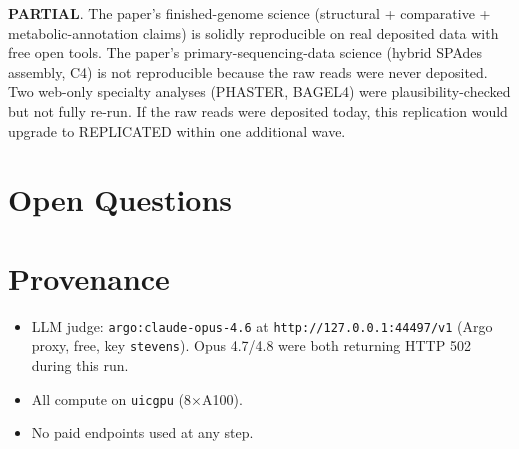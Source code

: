 \documentclass[11pt,letterpaper]{article}
\begin{document}
\textbf{PARTIAL}. The paper's finished-genome science (structural + comparative + metabolic-annotation claims) is solidly reproducible on real deposited data with free open tools. The paper's primary-sequencing-data science (hybrid SPAdes assembly, C4) is not reproducible because the raw reads were never deposited. Two web-only specialty analyses (PHASTER, BAGEL4) were plausibility-checked but not fully re-run. If the raw reads were deposited today, this replication would upgrade to REPLICATED within one additional wave.

\section{Open Questions}



\section{Provenance}

\begin{itemize}
  \item LLM judge: \texttt{argo:claude-opus-4.6} at \texttt{http://127.0.0.1:44497/v1} (Argo proxy, free, key \texttt{stevens}). Opus 4.7/4.8 were both returning HTTP 502 during this run.
  \item All compute on \texttt{uicgpu} (8$\times$A100).
  \item No paid endpoints used at any step.
\end{itemize}
\end{document}
